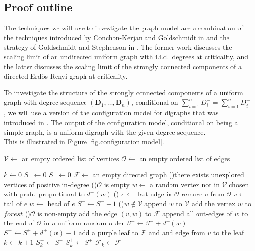 \subsection{Proof outline}

The techniques we will use to investigate the graph model are a combination of the techniques introduced by Conchon-Kerjan and Goldschmidt in \cite{conchon--kerjanStableGraphMetric2020} and the strategy of Goldschmidt and Stephenson in \cite{goldschmidtScalingLimitCritical2019}. The former work discusses the scaling limit of an undirected uniform graph with i.i.d.\ degrees at criticality, and the latter discusses the scaling limit of the strongly connected components of a directed Erd\H{o}s-Renyi graph at criticality.

To investigate the structure of the strongly connected components of a uniform graph with degree sequence $(\mathbf{D}_1,\dots,\mathbf{D}_n)$, conditional on $\sum_{i=1}^n D^-_i=\sum_{i=1}^n D^+_i$, we will use a version of the configuration model for digraphs that was introduced in \cite{cooperSizeLargestStrongly2004}. The output of the configuration model, conditional on being a simple graph, is a uniform digraph with the given degree sequence. \\
 This is illustrated in Figure \ref{fig.configuration model}. 

\def \exploredvertices {\mathcal V}
\def \explorededges {\mathcal E}
\def \forest {\mathcal F}
\def \edgestack {\mathcal O}
\begin{algorithm}[htbp]
    \SetAlgoLined
    $\exploredvertices \leftarrow$ an empty ordered list of vertices\;
    $\edgestack \leftarrow$ an empty ordered list of edges\;

    $k \leftarrow 0$ \;
    $S^- \leftarrow 0$ \;
    $S^+ \leftarrow 0$ \;
    $\forest \leftarrow$ an empty directed graph\;
    \While(){there exists unexplored vertices of positive in-degree}{
        \eIf(){$\edgestack$ is empty}{
            $w \leftarrow$ a random vertex not in $\exploredvertices$ chosen with prob.\ proportional to $d^-(w)$ \;
        }(){
            $e \leftarrow$ last edge in $\edgestack$ \;
            remove $e$ from $\edgestack$ \;
            $v \leftarrow$ tail of $e$\;
            $w \leftarrow$ head of $e$ \;
            $S^- \leftarrow S^- - 1$ \;
        }
        \eIf(){$w \not \in \exploredvertices$}{
            append $w$ to $\exploredvertices$ \; 
            add the vertex $w$ to $forest$ \;
            \If(){$\edgestack$ is non-empty}{
                add the edge $(v, w)$ to $\forest$\;
            }
            append all out-edges of $w$ to the end of $\edgestack$ in a uniform random order \;
            $S^- \leftarrow S^- + d^-(w)$ \;
            $S^+ \leftarrow S^+ + d^+(w) - 1$ \;
        }{
            add a purple leaf to $\forest$ and and edge from $v$ to the leaf \;
        }
        $k \leftarrow k + 1$ \;
        $S^-_k \leftarrow S^-$ \;
        $S^+_k \leftarrow S^+$ \;
        $\forest_k \leftarrow \forest$ \;
    }
\end{algorithm}

